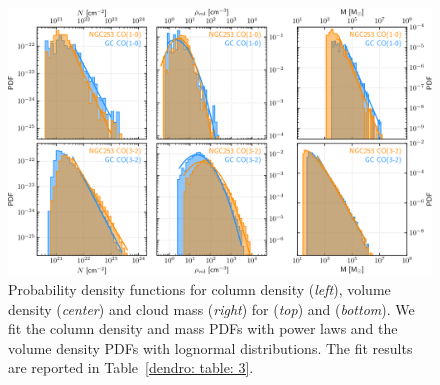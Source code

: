 \begin{figure}
    \centering
    \includegraphics[width=\textwidth]{images/chapters/papers/dendro/dendro_figC}
    \caption[Column density, volume density and mass PDFs]{Probability density functions for column density (\emph{left}), volume density (\emph{center}) and cloud mass (\emph{right}) for  (\emph{top}) and  (\emph{bottom}). We fit the column density and mass PDFs with power laws and the volume density PDFs with lognormal distributions. The fit results are reported in Table~\ref{dendro: table: 3}.
    \label{dendro: figure: C}}
\end{figure}

